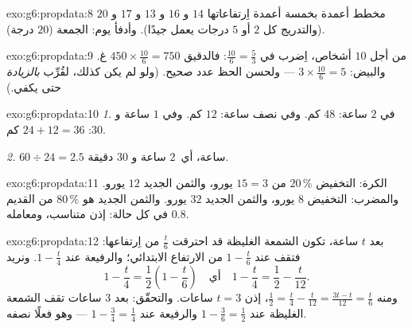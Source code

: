 \begin{solution}{exo:g6:propdata:8}
مخطط أعمدة بخمسة أعمدة اِرتفاعاتها $14$ و $16$ و $13$ و $17$ و $20$
(والتدريج كل $2$ أو $5$ درجات يعمل جيدًا). وأدفأ يوم: الجمعة
($20$ درجة).
\end{solution}

\begin{solution}{exo:g6:propdata:9}
من أجل $10$ أشخاص، اِضرب في $\frac{10}{6} = \frac53$: فالدقيق
$450 \times \frac{10}{6} = 750$ غ. والبيض:
$3 \times \frac{10}{6} = 5$ --- ولحسن الحظ عدد صحيح. (ولو لم يكن
كذلك، لقُرِّب \emph{بالزيادة} حتى يكفي.)
\end{solution}

\begin{solution}{exo:g6:propdata:10}
\emph{1.} في $2$ ساعة: $48$ كم. وفي نصف ساعة: $12$ كم. وفي
$1$ ساعة و $30$: $24 + 12 = 36$ كم.

\emph{2.} $60 \div 24 = 2.5$ ساعة، أي\ $2$ ساعة و $30$ دقيقة.
\end{solution}

\begin{solution}{exo:g6:propdata:11}
الكرة: التخفيض $20\,\%$ من $15 = 3$ يورو، والثمن الجديد $12$ يورو.
والمضرب: التخفيض $8$ يورو، والثمن الجديد $32$ يورو. والثمن الجديد هو
$80\,\%$ من القديم في كل حالة: إذن متناسب، ومعامله
$0.8$.
\end{solution}

\begin{solution}{exo:g6:propdata:12}
بعد $t$ ساعة، تكون الشمعة الغليظة قد احترقت $\frac t6$ من اِرتفاعها:
فتقف عند $1 - \frac t6$ من الارتفاع الابتدائي؛ والرفيعة عند
$1 - \frac t4$. ونريد
\[
1 - \frac t4 = \frac12 \left(1 - \frac t6\right)
\quad\text{أي}\quad
1 - \frac t4 = \frac12 - \frac t{12}.
\]
ومنه $\frac12 = \frac t4 - \frac t{12} = \frac{3t - t}{12} =
\frac{t}{6}$، إذن $t = 3$ ساعات. والتحقّق: بعد $3$ ساعات تقف الشمعة الغليظة
عند $1 - \frac36 = \frac12$ والرفيعة عند
$1 - \frac34 = \frac14$ --- وهو فعلًا نصفه.
\end{solution}

